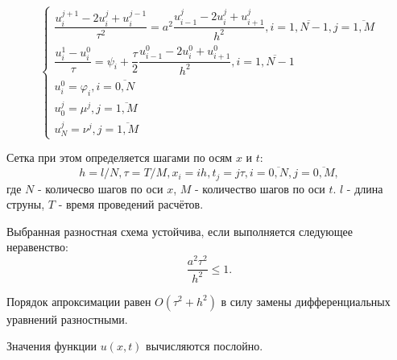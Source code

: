 \documentclass[a4paper,12pt]{report}
\begin{document}
\begin{displaymath}
	\left\{
		\begin{array}{l}
			\dfrac{u_{i}^{j+1} - 2u_{i}^{j} + u_{i}^{j-1}}{\tau^{2}} = a^{2} \dfrac{u_{i-1}^{j} - 2u_{i}^{j} + u_{i+1}^{j}}{h^{2}}, i = \overline{1, N-1}, j= \overline{1, M} \\
			\dfrac{u_{i}^{1} - u_{i}^{0}}{\tau} = \psi_{i} + \dfrac{\tau}{2} \dfrac{u_{i-1}^{0} - 2u_{i}^{0} + u_{i+1}^{0}}{h^{2}}, i= \overline{1, N-1} \\
			u_{i}^{0} = \varphi_{i}, i = \overline{0, N}  \\
			u_{0}^{j} = \mu^{j}, j = \overline{1, M} \\
			u_{N}^{j} = \nu^{j}, j = \overline{1, M}
		\end{array} \right.
\end{displaymath}

Сетка при этом определяется шагами по осям $x$ и $t$:
\begin{equation}
	h = l / N, \tau = T / M, x_{i} = ih, t_{j} = j\tau, i =\overline{0, N}, j = \overline{0, M},
\end{equation}
где $N$ -  количесво шагов по оси $x$, $M$ - количество шагов по оси $t$. $l$ - длина струны, $T$ - время проведений расчётов.

Выбранная разностная схема устойчива, если выполняется следующее неравенство:
\begin{equation}
	\dfrac{a^{2}\tau^{2}}{h^2} \le 1.
\end{equation}

Порядок апроксимации равен $O(\tau^{2} + h^{2})$ в силу замены дифференциальных уравнений
разностными.

Значения функции $u(x, t)$ вычисляются послойно.
\end{document}
